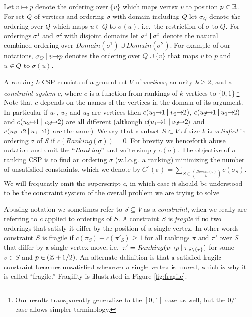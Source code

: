 \documentclass[dvips,11pt,letter]{article}
\newcommand{\set}[1]{\{#1\}}                        \newcommand{\setof}[2]{\{\,{#1}\::\:{#2}\,\}}        \newcommand{\groupFrac}[2]{\left(\frac{#1}{#2}\right)}
\newcommand{\sm}{\setminus} \newcommand{\compl}[1]{\overline{#1}}                \newcommand{\floor}[1]{\left\lfloor #1 \right\rfloor}
\newcommand{\unaryOrdering}{\!\!\mapsto\!\!}
\newcommand{\bp}{\,\,\rule[-0.22em]{0.08em}{1em}\,\,} \newcommand{\restrictO}[2]{{#1}_{#2}}
\begin{document}
Let $v \unaryOrdering p$ denote the ordering over $\set{v}$ which maps vertex $v$ to position $p \in \mathbb{R}$.
For set $Q$ of vertices and ordering $\sigma$ with domain including $Q$ let $\restrictO{\sigma}{Q}$ denote the ordering over $Q$ which maps $u \in Q$ to $\sigma(u)$, i.e.\ the restriction of $\sigma$ to $Q$. For orderings $\sigma^1$ and $\sigma^2$ with disjoint domains let  $\sigma^1\bp \sigma^2$ denote the natural combined ordering over $Domain(\sigma^1) \cup Domain(\sigma^2)$. For example of our notations, $\restrictO{\sigma}{Q} \bp v \unaryOrdering p$ denotes the ordering over $Q \cup \set{v}$ that maps $v$ to $p$ and $u \in Q$ to $\sigma(u)$.

A ranking $k$-CSP consists of a ground set $V$ of \emph{vertices}, an arity $k \ge 2$, and a \emph{constraint system} $c$, where $c$ is a function from rankings of $k$ vertices to $\set{0,1}$.\footnote{Our results transparently generalize to the $[0,1]$ case as well, but the 0/1 case allows simpler terminology.}
Note that $c$ depends on the names of the vertices in the domain of its argument. In particular if $u_1$, $u_2$ and $u_3$ are vertices then $c(u_1 \unaryOrdering 1 \bp u_2 \unaryOrdering 2)$,  $c(u_2 \unaryOrdering 1 \bp u_1 \unaryOrdering 2)$ and $c(u_2 \unaryOrdering 1 \bp u_3 \unaryOrdering 2)$ are all different (although $c(u_1 \unaryOrdering 1 \bp u_2 \unaryOrdering 2)$ and $c(u_2 \unaryOrdering 2 \bp u_1 \unaryOrdering 1)$ are the same).
We say that a subset $S \subset V$ of size $k$ is \emph{satisfied} in ordering $\sigma$ of $S$ if $c(Ranking(\sigma)) = 0$. For brevity we henceforth abuse notation and omit the ``$Ranking$'' and  write simply $c(\sigma)$. The objective of a ranking CSP is to find an ordering $\sigma$ (w.l.o.g.\ a ranking) minimizing the number of unsatisfied constraints, which we denote by $C^c(\sigma) = \sum_{S \in \binom{Domain(\sigma)}{k}} c(\restrictO{\sigma}{S})$. We will frequently omit the superscript $c$, in which case it should be understood to be the constraint system of the overall problem we are trying to solve.

Abusing notation we sometimes refer to $S \subseteq V$ as a \emph{constraint}, when we really are referring to $c$ applied to orderings of $S$.
A constraint $S$ is \emph{fragile} if no two orderings that satisfy it differ by the position of a single vertex. In other words constraint $S$ is fragile if $c(\restrictO{\pi}{S}) + c(\restrictO{\pi'}{S}) \ge 1$ for all rankings $\pi$ and $\pi'$ over $S$ that differ by a single vertex move, i.e.\ $\pi' = Ranking(v \unaryOrdering p \bp \restrictO{\pi}{S \sm \set{v}})$ for some $v \in S$ and $p \in (\mathbb{Z} + 1/2)$. An alternate definition is that a satisfied fragile constraint becomes unsatisfied whenever a single vertex is moved, which is why it is called ``fragile.'' Fragility is illustrated in Figure \ref{fig:fragile}.
\end{document}
